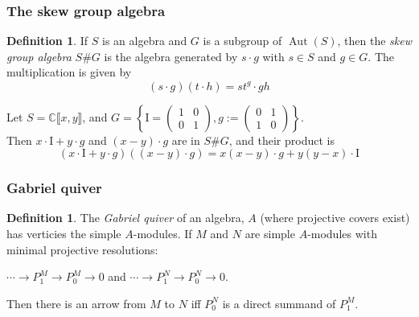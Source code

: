 \documentclass[screen, aspectratio=43]{beamer}
\theoremstyle{definition}
\newtheorem{defin}[theorem]{Definition}
\newcommand{\C}{\mathbb{C}}
\DeclareMathOperator{\Aut}{Aut}
\begin{document}
\begin{frame}
	\frametitle{The skew group algebra}
	\begin{defin}
		If $S$ is an algebra and $G$ is a subgroup of $\Aut(S)$, then the \textit{skew group algebra} $S\#G$ is the algebra generated by $s \cdot g$ with $s \in S$ and $g \in G$. The multiplication is given by $$(s \cdot g)(t \cdot h) = s t^g \cdot gh$$
	\end{defin}
	\begin{example}
		Let $S= \C \llbracket x, y \rrbracket$, and $G = \left\{ \mathrm{I}= \begin{pmatrix}
		1 & 0\\
		0 & 1
		\end{pmatrix}, g:= \begin{pmatrix}
		0 & 1\\
		1 & 0
		\end{pmatrix} \right\}$. \\
		Then $x \cdot \mathrm{I} + y\cdot g$ and $(x-y) \cdot g$ are in $S\#G$, and their product is $$(x \cdot \mathrm{I} + y\cdot g)((x-y) \cdot g) = x(x-y) \cdot g + y(y-x) \cdot \mathrm{I}$$
	\end{example}
\end{frame}

\begin{frame}
	\frametitle{Gabriel quiver}
	\begin{defin}
		The \textit{Gabriel quiver} of an algebra, $A$ (where projective covers exist) has verticies the simple $A$-modules. If $M$ and $N$ are simple $A$-modules with minimal projective resolutions:
		\begin{center}
		$
		\cdots \to P^M_1 \to P^M_0 \to 0
		$
		\hspace{1cm}
		and
		\hspace{1cm}
		$
		\cdots \to P^N_1 \to P^N_0 \to 0
		$.
		\end{center}
		Then there is an arrow from $M$ to $N$ iff $P^N_0$ is a direct summand of $P^M_1$.
	\end{defin}
\end{frame}
\end{document}
